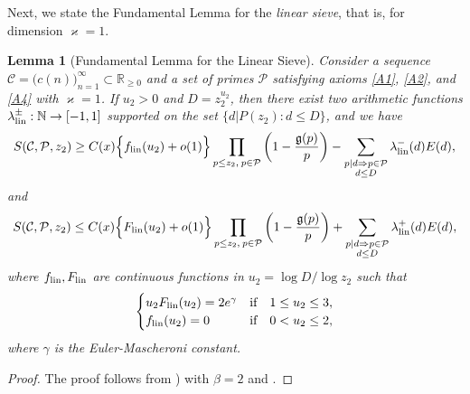 \documentclass[12pt]{amsart}
\numberwithin{equation}{section}
\newtheorem{lemma}[theorem]{Lemma}
\theoremstyle{remark}
\theoremstyle{definition}
\begin{document}
Next, we state the Fundamental Lemma for the {\it linear sieve}, that is, for dimension $\varkappa=1$.
\begin{lemma}[Fundamental Lemma for the Linear Sieve]\label{fundlin}
Consider a sequence $\mathcal{C} = \big(c(n)\big)_{n=1}^\infty\subset\mathbb{R}_{\geq 0}$ and a set of primes $\mathcal{P}$ satisfying axioms \ref{A1}, \ref{A2}, and \ref{A4} with $\varkappa = 1$. If $u_2>0$ and $D=z_2^{u_2}$, then there exist two arithmetic functions $\lambda^\pm_{\textup{lin}}: \mathbb{N}\rightarrow [-1, 1]$ supported on the set $\{d|P(z_2): d\leq D\}$, and we have
\begin{equation}\label{lowerl}
 S(\mathcal{C}, \mathcal{P}, z_2) \geq C(x)\Big\{f_{\textup{lin}}(u_2) + o(1)\Big\}\prod_{p\leq z_2,\: p\in \mathcal{P}}\bigg(1-\dfrac{\mathfrak{g}(p)}{p}\bigg) - \sum_{\substack{p|d \Rightarrow p \in \mathcal{P}\\ d\leq D}}\lambda^-_{\textup{lin}}(d){E}(d),
\end{equation}
and
\begin{equation}\label{upperl}
S(\mathcal{C}, \mathcal{P}, z_2) \leq C(x)\Big\{F_{\textup{lin}}(u_2) + o(1)\Big\}\prod_{p\leq z_2,\: p\in \mathcal{P}}\bigg(1-\dfrac{\mathfrak{g}(p)}{p}\bigg) +\sum_{\substack{p|d \Rightarrow p \in \mathcal{P}\\ d\leq D}}\lambda^+_{\textup{lin}}(d){E}(d),
\end{equation}
where $f_{\textup{lin}}, F_{\textup{lin}}$ are continuous functions in $u_2 = \log D/\log z_2$ such that 
\begin{equation}
\begin{cases} \label{sl}
u_2 F_{\textup{lin}}(u_2)=2e^\gamma & \text{if}\quad 1 \leq u_2 \leq 3, \\ 
f_{\textup{lin}}(u_2) = 0 & \text{if}\quad 0<u_2\leq 2,
\end{cases}
\end{equation}
where $\gamma$ is the Euler-Mascheroni constant.

\end{lemma}

\begin{proof}
The proof follows from \cite[Theorem 11.12--Theorem 11.13 ]{opera}) with $\beta=2$ and \cite[Chapter 12 (pp. 235--236)]{opera}.
\end{proof}
\end{document}
